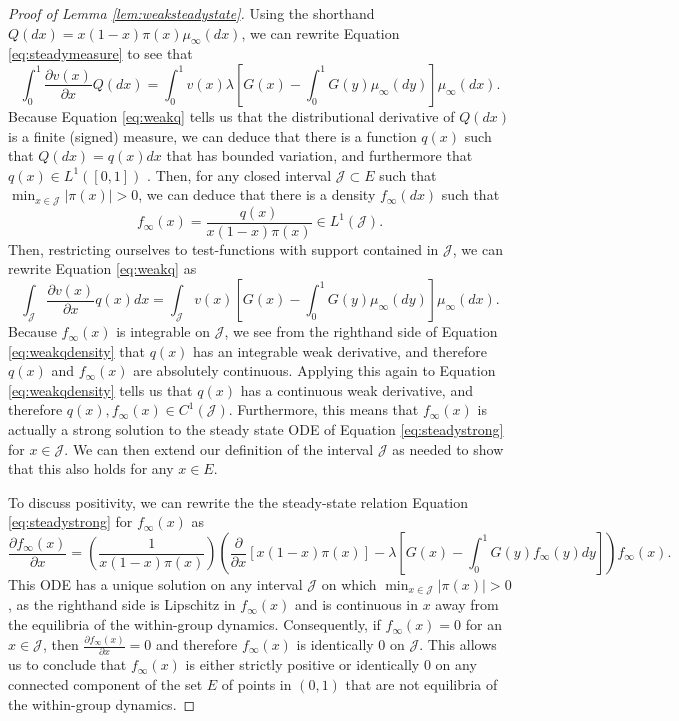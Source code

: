 \documentclass[11pt]{article}
\numberwithin{equation}{section}
\newcommand{\mc}{\mathcal}
\newcommand{\del}[2]{\frac{\partial #1}{\partial #2}}
\newcommand{\dsdel}[2]{\displaystyle\frac{\partial #1}{\partial #2}}
\begin{document}
{\begin{proof}[Proof of Lemma \ref{lem:weaksteadystate}]
 Using the shorthand $Q(dx) = x (1-x) \pi(x) \mu_{\infty}(dx)$, we can rewrite Equation \eqref{eq:steadymeasure} to see that
 \begin{equation} \label{eq:weakq}
    \int_0^1 \dsdel{v(x)}{x} Q(dx)  = \int_0^1 v(x) \lambda  \left[ G(x) - \int_0^1 G(y) \mu_{\infty} (dy) \right] \mu_{\infty}(dx).
 \end{equation}
Because Equation \eqref{eq:weakq} tells us that the distributional derivative of $Q(dx)$ is a finite (signed) measure, we can deduce that there is a function $q(x)$ such that $Q(dx) = q(x) dx$ that has bounded variation, and furthermore that $q(x) \in L^1\left([0,1]\right)$ \cite{evans2015measure}. Then, for any closed interval $\mc{J} \subset E$ such that $\min_{x \in \mc{J}} |\pi(x)| > 0$, we can deduce that there is a density $f_{\infty}(dx)$ such that 
\[f_{\infty}(x)  = \frac{q(x)}{x (1-x) \pi(x)} \in L^1\left(\mc{J}\right). \] Then, restricting ourselves to test-functions with support contained in $\mc{J}$, we can rewrite Equation \eqref{eq:weakq} as
 \begin{equation} \label{eq:weakqdensity}
    \int_{\mc{J}}  \dsdel{v(x)}{x} q(x) dx = \int_{\mc{J}} v(x) \left[G(x) - \int_0^1 G(y) \mu_{\infty}(dy) \right] \mu_{\infty}(dx).
 \end{equation}
Because $f_{\infty}(x)$ is integrable on $\mc{J}$, we see from the righthand side of Equation \eqref{eq:weakqdensity} that $q(x)$ has an integrable weak derivative, and therefore $q(x)$ and $f_{\infty}(x)$ are absolutely continuous. Applying this again to Equation \eqref{eq:weakqdensity} tells us that $q(x)$ has a continuous weak derivative, and therefore $q(x), f_{\infty}(x) \in C^1\left(\mc{J} \right)$. Furthermore, this means that $f_{\infty}(x)$ is actually a strong solution to the steady state ODE of Equation \eqref{eq:steadystrong} for $x \in \mc{J}$. We can then extend our definition of the interval $\mc{J}$ as needed to show that this also holds for any $x \in E$.  
 
To discuss positivity, we can rewrite the the steady-state relation Equation \eqref{eq:steadystrong}  for $f_{\infty}(x)$ as 
\begin{equation} \label{eq:finfODE}
    \dsdel{f_{\infty}(x)}{x} = \left(\frac{1}{x (1-x) \pi(x)}\right) \left( \dsdel{}{x}\left[x(1-x) \pi(x) \right] -\lambda \left[ G(x) - \int_0^1 G(y) f_{\infty}(y) dy \right]  \right) f_{\infty}(x).
    \end{equation}
This ODE has a unique solution on any interval $\mc{J}$ on which $\min_{x \in \mc{J}} |\pi(x)| > 0$, as the righthand side is Lipschitz in $f_{\infty}(x)$ and is continuous in $x$ away from the equilibria of the within-group dynamics. Consequently, if $f_{\infty}(x) = 0$ for an $x \in \mc{J}$, then $\del{f_{\infty}(x)}{x} = 0$ and therefore $f_{\infty}(x)$ is identically $0$ on $\mc{J}$. This allows us to conclude that $f_{\infty}(x)$ is either strictly positive or identically $0$ on any connected component of the set $E$ of points in $(0,1)$ that are not equilibria of the within-group dynamics. 
\end{proof}


}
\end{document}
